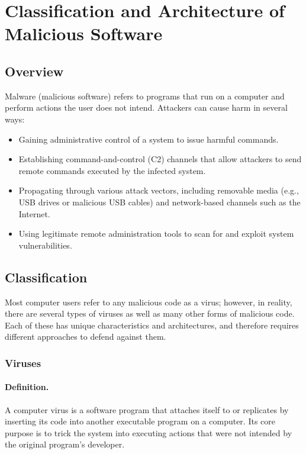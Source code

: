 \section{Classification and Architecture of Malicious Software}

\subsection{Overview}

Malware (malicious software) refers to programs that run on a computer and perform actions the user does not intend. Attackers can cause harm in several ways:

\begin{itemize}
  \item Gaining administrative control of a system to issue harmful commands.
  \item Establishing command-and-control (C2) channels that allow attackers to send remote commands executed by the infected system.
  \item Propagating through various attack vectors, including removable media (e.g., USB drives or malicious USB cables) and network-based channels such as the Internet.
  \item Using legitimate remote administration tools to scan for and exploit system vulnerabilities.
\end{itemize}

\subsection{Classification}

Most computer users refer to any malicious code as a virus; however, in reality, there are several types of viruses as well as many other forms of malicious code. Each of these has unique characteristics and architectures, and therefore requires different approaches to defend against them.

\subsubsection{Viruses}

\paragraph{Definition.}
A computer virus is a software program that attaches itself to or replicates by inserting its code into another executable program on a computer. Its core purpose is to trick the system into executing actions that were not intended by the original program's developer.

